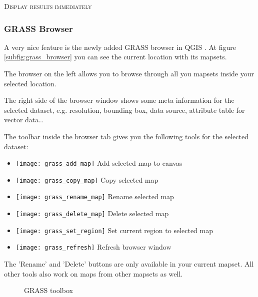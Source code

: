 \begin{Tip}\caption{\textsc{Display results immediately}}
\end{Tip} 


\subsubsection{GRASS Browser} 

A very nice feature is the newly added GRASS browser in QGIS \CURRENT. At figure \ref{subfig:grass_browser}
you can see the current location with its mapsets. 

The browser on the left allows you to browse through all you mapsets inside your selected
location. 

The right side of the browser window shows some meta information for the selected dataset, e.g. resolution,
bounding box, data source, attribute table for vector data\dots

The toolbar inside the browser tab gives you the following tools for the selected dataset:
\begin{itemize}
\item \texttt{[image: grass\_add\_map]} Add selected map to canvas
\item \texttt{[image: grass\_copy\_map]} Copy selected map
\item \texttt{[image: grass\_rename\_map]} Rename selected map
\item \texttt{[image: grass\_delete\_map]} Delete selected map
\item \texttt{[image: grass\_set\_region]} Set current region to selected map
\item \texttt{[image: grass\_refresh]} Refresh browser window
\end{itemize}

The 'Rename' and 'Delete' buttons are only available in your current mapset. All other tools also work on
maps from other mapsets as well.

\begin{figure}[h]
\centering
	\caption{GRASS toolbox}
   \goodgap
\end{figure}

